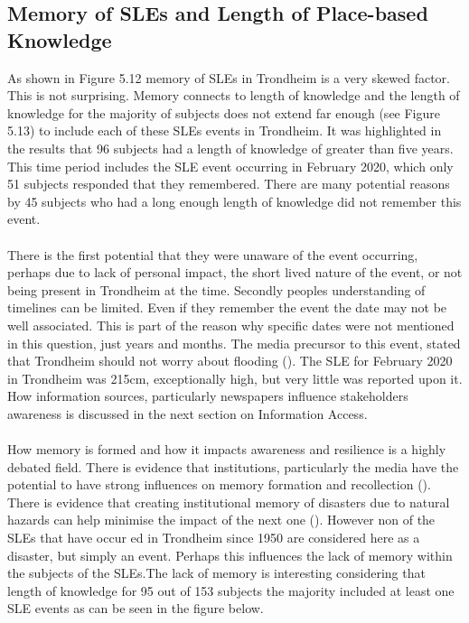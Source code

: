 \subsection{Memory of SLEs and Length of Place-based Knowledge}
As shown in Figure 5.12 memory of SLEs in Trondheim is a very skewed factor. This is not surprising. Memory connects to length of knowledge and the length of knowledge for the majority of subjects does not extend far enough (see Figure 5.13) to include each of these SLEs events in Trondheim. It was highlighted in the results that 96 subjects had a length of knowledge of greater than five years. This time period includes the SLE event occurring in February 2020, which only 51 subjects responded that they remembered. There are many potential reasons by 45 subjects who had a long enough length of knowledge did not remember this event. 
\paragraph{}
There is the first potential that they were unaware of the event occurring, perhaps due to lack of personal impact, the short lived nature of the event, or not being present in Trondheim at the time. Secondly peoples understanding of timelines can be limited. Even if they remember the event the date may not be well associated. This is part of the reason why specific dates were not mentioned in this question, just years and months. 
The media precursor to this event, stated that Trondheim should not worry about flooding (\cite{baisotti_danger_2020}). The SLE for February 2020 in Trondheim was 215cm, exceptionally high, but very little was reported upon it. How information sources, particularly newspapers influence stakeholders awareness is discussed in the next section on Information Access.
\paragraph{}
How memory is formed and how it impacts awareness and resilience is a highly debated field. There is evidence that institutions, particularly the media have the potential to have strong influences on memory formation and recollection (\cite{de_guttry_expiry_2022}). There is evidence that creating institutional memory of disasters due to natural hazards can help minimise the impact of the next one (\cite{de_guttry_expiry_2022}). However non of the SLEs that have occur ed in Trondheim since 1950 are considered here as a disaster, but simply an event. Perhaps this influences the lack of memory within the subjects of the SLEs.The lack of memory is interesting considering that length of knowledge for 95 out of 153 subjects the majority included at least one SLE events as can be seen in the figure below. 
